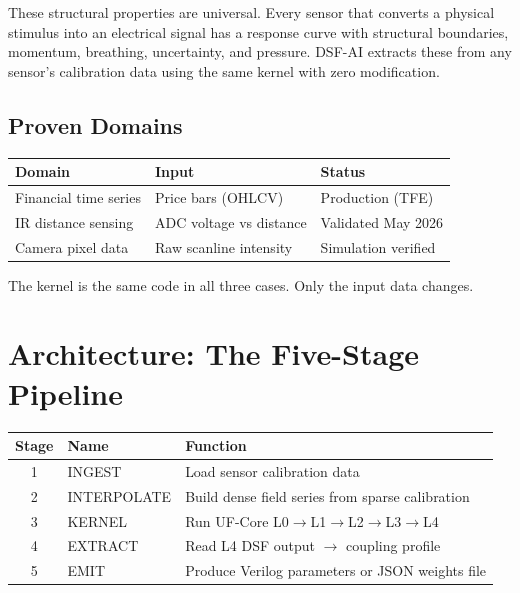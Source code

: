 \documentclass[11pt,a4paper]{article}
\begin{document}
These structural properties are universal. Every sensor that
converts a physical stimulus into an electrical signal has a
response curve with structural boundaries, momentum, breathing,
uncertainty, and pressure. DSF-AI extracts these from any
sensor's calibration data using the same kernel with zero
modification.

\subsection{Proven Domains}

\begin{center}
\begin{tabular}{@{}lll@{}}
\toprule
\textbf{Domain} & \textbf{Input} & \textbf{Status} \\
\midrule
Financial time series & Price bars (OHLCV) & Production (TFE) \\
IR distance sensing & ADC voltage vs distance & Validated May 2026 \\
Camera pixel data & Raw scanline intensity & Simulation verified \\
\bottomrule
\end{tabular}
\end{center}

The kernel is the same code in all three cases. Only the input
data changes.

\section{Architecture: The Five-Stage Pipeline}

\begin{center}
\begin{tabular}{@{}clp{8cm}@{}}
\toprule
\textbf{Stage} & \textbf{Name} & \textbf{Function} \\
\midrule
1 & INGEST & Load sensor calibration data \\
2 & INTERPOLATE & Build dense field series from sparse calibration \\
3 & KERNEL & Run UF-Core L0$\rightarrow$L1$\rightarrow$L2$\rightarrow$L3$\rightarrow$L4 \\
4 & EXTRACT & Read L4 DSF output $\rightarrow$ coupling profile \\
5 & EMIT & Produce Verilog parameters or JSON weights file \\
\bottomrule
\end{tabular}
\end{center}
\end{document}
